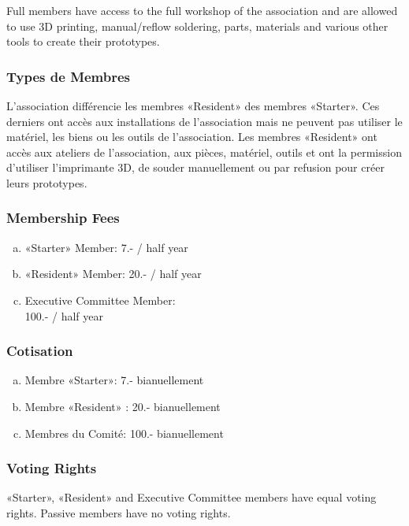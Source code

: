 \documentclass[12pt,a4paper,oneside]{article}
\newcounter{art}
\newcommand{\english}{    \switchcolumn[0]\noindent}
\newcommand{\french}{    \switchcolumn[1]\noindent}
\begin{document}
\begin{paracol}{2}
	Full members have access to the full workshop of the association and are allowed to use 3D printing, manual/reflow soldering, parts, materials and various other tools to create their prototypes.


\french
	\subsubsection{Types de Membres}
	L’association différencie les membres «Resident» des membres «Starter». Ces derniers ont accès aux installations de l’association mais ne peuvent pas utiliser le matériel, les biens ou les outils de l’association. Les membres «Resident» ont accès aux ateliers de l’association, aux pièces, matériel, outils et ont la permission d’utiliser l’imprimante 3D, de souder manuellement ou par refusion pour créer leurs prototypes.



\english
	\subsubsection{Membership Fees}

	\begin{enumerate}[(a)]
	\item «Starter» Member: 7.- / half year 
	\item «Resident» Member: 20.- / half year 
	\item Executive Committee Member: \\ 100.- / half year 

	\end{enumerate}


\french
	\subsubsection{Cotisation}
	\begin{enumerate}[(a)]
	\item Membre «Starter»: 7.- bianuellement
	\item Membre «Resident» : 20.- bianuellement
	\item Membres du Comité: 100.- bianuellement
	\end{enumerate}


\english
	\subsubsection{Voting Rights}
	 «Starter», «Resident» and Executive Committee members have equal voting rights. Passive members have no voting rights.
\french

\end{paracol}
\end{document}
